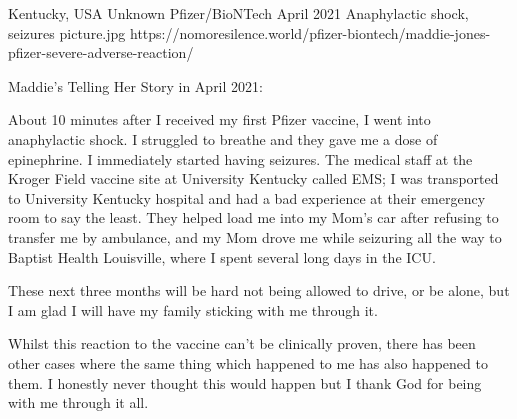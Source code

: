           {Kentucky, USA}
          {Unknown}
          {Pfizer/BioNTech}
          {April 2021}
          {Anaphylactic shock, seizures}
          {picture.jpg}
          {https://nomoresilence.world/pfizer-biontech/maddie-jones-pfizer-severe-adverse-reaction/}
          {

Maddie's Telling Her Story in April 2021:

About 10 minutes after I received my first Pfizer vaccine, I went into
anaphylactic shock. I struggled to breathe and they gave me a dose of
epinephrine. I immediately started having seizures. The medical staff at the
Kroger Field vaccine site at University Kentucky called EMS; I was transported
to University Kentucky hospital and had a bad experience at their emergency room
to say the least. They helped load me into my Mom’s car after refusing to
transfer me by ambulance, and my Mom drove me while seizuring all the way to
Baptist Health Louisville, where I spent several long days in the ICU.

These next three months will be hard not being allowed to drive, or be alone,
but I am glad I will have my family sticking with me through it.

Whilst this reaction to the vaccine can’t be clinically proven, there has been
other cases where the same thing which happened to me has also happened to
them. I honestly never thought this would happen but I thank God for being with
me through it all.

}
